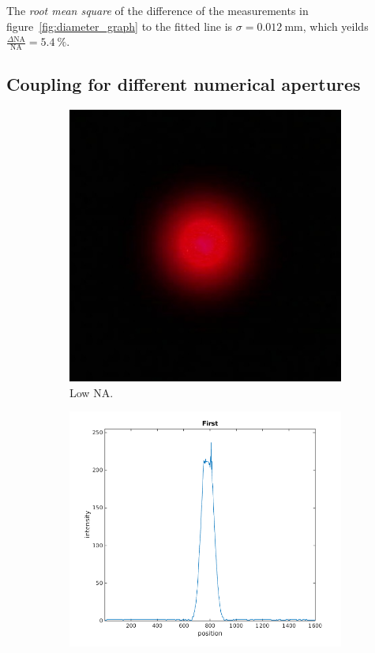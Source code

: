 \documentclass[a4paper, 12pt]{paper}
\begin{document}
The \emph{root mean square} of the difference of the measurements in figure~\ref{fig:diameter_graph} to the fitted line is $\sigma = \SI{0.012}{\milli\meter}$, which yeilds $\frac{\Delta \mbox{NA}}{\mbox{NA}} = \SI{5.4}{\percent}$. 


\subsection{Coupling for different numerical apertures}

\begin{figure}[H]
    \centering
    \begin{subfigure}[t]{0.40\textwidth}
        \includegraphics[width=\textwidth]{img/first.jpg}
        \caption{Low NA.}
    \end{subfigure}
    \begin{subfigure}[t]{0.45\textwidth}
        \includegraphics[width=\textwidth]{img/first_line}

\end{subfigure}
\end{figure}
\end{document}
